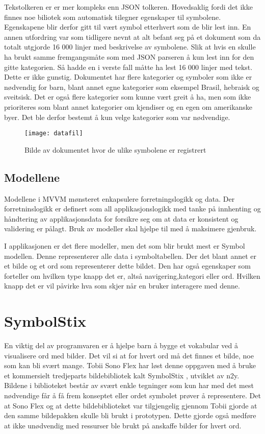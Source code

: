 {Tekstolkeren er er mer kompleks enn JSON tolkeren. Hovedsaklig fordi det ikke finnes noe biliotek som automatisk tilegner egenskaper til symbolene. Egenskapene blir derfor gitt til vært symbol etterhvert som de blir lest inn. En annen utfordring var som tidligere nevnt at alt befant seg på et dokument som da totalt utgjorde 16 000 linjer med beskrivelse av symbolene. Slik at hvis en skulle ha brukt samme fremgangsmåte som med JSON parseren å kun lest inn for den gitte kategorien. Så hadde en i verste fall måtte ha lest 16 000 linjer med tekst. Dette er ikke gunstig. Dokumentet har flere kategorier og symboler som ikke er nødvendig for barn, blant annet egne kategorier som eksempel Brasil, hebraisk og sveitsisk. Det er også flere kategorier som kunne vært greit å ha, men som ikke prioriteres som blant annet kategorier om kjendiser og en egen om amerikanske byer. Det ble derfor bestemt å kun velge kategorier som var nødvendige.

\begin{figure}[ht!] 
\centering 
\texttt{[image: datafil]} 
\caption{Bilde av dokumentet hvor de ulike symbolene er registrert} 
\label{fig:dok} 
\end{figure} 


\subsection{Modellene}

Modellene i MVVM mønsteret enkapsulere forretningslogikk og data. Der forretninslogikk er definert som all applikasjonslogikk med tanke på innhenting og håndtering av applikasjonsdata for forsikre seg om at data er konsistent og validering er pålagt. Bruk av modeller skal hjelpe til med å maksimere gjenbruk.

I applikasjonen er det flere modeller, men det som blir brukt mest er Symbol modellen. Denne representerer alle data i symboltabellen. Der det blant annet er et bilde og et ord som representerer dette bildet. Den har også egenskaper som forteller om hvilken type knapp det er, altså navigering,kategori eller ord. Hvilken knapp det er vil påvirke hva som skjer når en bruker interagere med denne.



\section{SymbolStix} 
 
En viktig del av programvaren er å hjelpe barn å bygge et vokabular ved å visualisere ord med bilder. Det vil si at for hvert ord må det finnes et bilde, noe som kan bli svært mange. Tobii Sono Flex har løst denne oppgaven med å bruke et kommersielt tredjeparts bildebibliotek kalt SymbolStix \cite{n2y}, utviklet av n2y. Bildene i biblioteket består av svært enkle tegninger som kun har med det mest nødvendige får å få frem konseptet eller ordet symbolet prøver å representere. Det at Sono Flex og at dette bildebiblioteket var tilgjengelig gjennom Tobii gjorde at den samme bildepakken skulle bli brukt i prototypen. Dette gjorde også medføre at ikke unødvendig med ressurser ble brukt på anskaffe bilder for hvert ord. 
 
}
